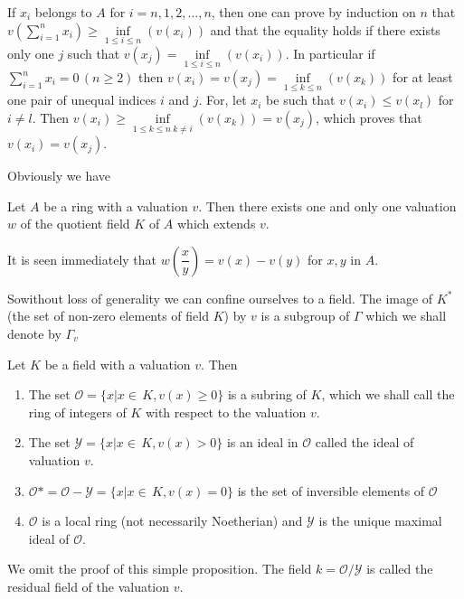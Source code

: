 If $x_i$ belongs to $A$ for $i =n, 1, 2, \ldots, n$, then one can prove
by induction on $n$ that $v(\sum\limits^n_{i=1} x_i) \geq
\inf\limits_{1\leq i \leq n}(v(x_i))$ and that the equality holds if
there exists only one $j$ such that $v(x_j)= \inf\limits_{1\leq i
  \leq n}(v(x_i))$. In particular if $\sum\limits^n_{i = 1} x_i = 0 \,(n
\geq 2)$ then $v(x_i)= v(x_j)= \inf\limits_{1\leq k \leq n}(v(x_k))$
for at least one pair of unequal indices $i$ and $j$. For, let $x_i$
be such that $v(x_i)\leq v(x_l)$ for $i \neq l$. Then $v(x_i) \geq
\inf\limits_{1\leq k \leq n~ k \neq i} (v (x_k)) = v(x_j)$, which
proves that $v(x_i)= v(x_j)$. 

Obviously we have  
\begin{prop}\label{part1:chap1:sec1:prop1}
  Let $A$ be a ring with a valuation $v$. Then there exists one and
  only one valuation $w$ of the quotient field $K$ of $A$ which
  extends $v$. 

  It is seen immediately that $w\left(\dfrac{x}{y}\right)= v (x)-v(y)$
  for $x,y$ in $A$. 
\end{prop}

So\pageoriginale without loss of generality we can confine ourselves
to a field. The 
image of $K^*$ (the set of non-zero elements of field $K$) by $v$ is a
subgroup of $\Gamma$ which we shall denote by $\Gamma_v$ 
\begin{prop}\label{part1:chap1:sec1:prop2}
  Let $K$ be a field with a valuation $v$. Then 
  \begin{enumerate}[\rm (a)]
  \item The set $\mathscr{O} = \{x | x \in \,K, v (x) \geq 0 \}$ is a
    subring of $K$, which we shall call the ring of integers of $K$
    with respect to the valuation $v$. 
  \item The set $\mathscr{Y} = \{x | x \in\, K, v (x) > 0 \}$ is an ideal
    in $\mathscr{O}$ called the ideal of valuation $v$. 
  \item $\mathscr{O}* = \mathscr{O} - \mathscr{Y}= \{x | x \in\,K, v (x) =
    0 \}$ is the set of inversible elements of $\mathscr{O}$ 
  \item $\mathscr{O}$ is a local ring (not necessarily Noetherian) and
    $\mathscr{Y}$ is the unique maximal ideal of $\mathscr{O}$. 
  \end{enumerate}
  We omit the proof of this simple proposition. The field $k =
  \mathscr{O}/ \mathscr{Y}$ is called the residual field of the valuation $v$. 
\end{prop}

